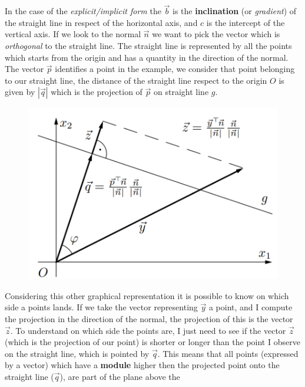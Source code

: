 \documentclass{article}
\begin{document}
In the case of the \textit{explicit/implicit form} the $\vec{b}$ is the \textbf{inclination}
(or \textit{gradient}) of the straight line in respect of the horizontal axis,
and $c$ is the intercept of the vertical axis.
\newline\newline
If we look to the normal $\vec{n}$ we want to pick the vector which is \textit{orthogonal}
to the straight line. The straight line is represented by all the points which starts from the
origin and has a quantity in the direction of the normal. The vector $\vec{p}$ identifies a
point in the example, we consider that point belonging to our straight line,
the distance of the straight line respect to the origin $O$ is given by $|\vec{q}|$ which is
the projection of $\vec{p}$ on straight line $g$.
\begin{figure}[H]
    \centering
    \includegraphics[scale=1]{images/geom2.png}
    \label{fig:geom_2}
\end{figure}
Considering this other graphical representation it is possible to know on which side
a points lands. If we take the vector representing $\vec{y}$ a point,
and I compute the projection in the direction of the normal, the projection
of this is the vector $\vec{z}$.
\newline\newline
To understand on which side the points are, I just need to see if the vector $\vec{z}$ (which is the
projection of our point) is shorter or longer than the point I observe on the straight line, which
is pointed by $\vec{q}$. This means that all points (expressed by a vector) which have a \textbf{module}
higher then the projected point onto the straight line ($\vec{q}$), are part of the plane above the
\end{document}
